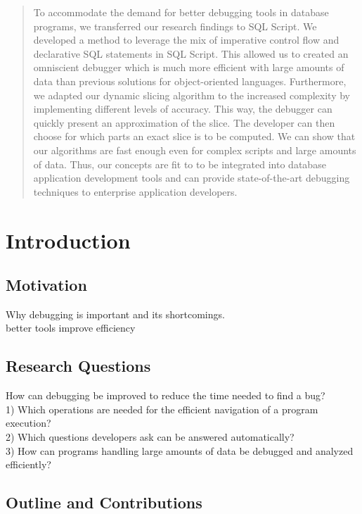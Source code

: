 \documentclass[english]{scrartcl}
\begin{document}
\begin{abstract}
To accommodate the demand for better debugging tools in database programs, we transferred our research findings to SQL Script.
We developed a method to leverage the mix of imperative control flow and declarative SQL statements in SQL Script. 
This allowed us to created an omniscient debugger which is much more efficient with large amounts of data than previous solutions for object-oriented languages.
Furthermore, we adapted our dynamic slicing algorithm to the increased complexity by implementing different levels of accuracy.
This way, the debugger can quickly present an approximation of the slice.
The developer can then choose for which parts an exact slice is to be computed.
We can show that our algorithms are fast enough even for complex scripts and large amounts of data.
Thus, our concepts are fit to to be integrated into database application development tools and can provide state-of-the-art debugging techniques to enterprise application developers.

\end{abstract}

\section{Introduction}

\subsection{Motivation}
Why debugging is important and its shortcomings.\\
better tools improve efficiency

\subsection{Research Questions}
How can debugging be improved to reduce the time needed to find a bug?\\
1) Which operations are needed for the efficient navigation of a program execution?\\
2) Which questions developers ask can be answered automatically?\\
3) How can programs handling large amounts of data be debugged and analyzed efficiently?\\

\subsection{Outline and Contributions}
\end{document}

